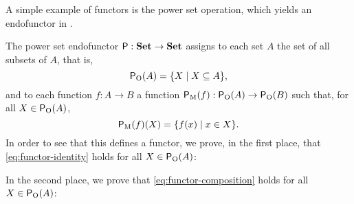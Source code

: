 A simple example of functors is the power set operation, which yields
an endofunctor in \set.

\begin{example}
  \label{ex:functor-power-set}


  The power set endofunctor $\mathsf{P}: \mathbf{Set} \to \mathbf{Set}$ assigns to each
  set $A$ the set of all subsets of $A$, that is,
  \begin{equation}
    \label{eq:functor-power-set-object}
    \mathsf{P}_{\operatorname{O}}(A) = \{X \mid X \subseteq A\}
    \text{,}
  \end{equation}
  and to each function $f: A \to B$ a function $\mathsf{P}_{\operatorname{M}}(f):
  \mathsf{P}_{\operatorname{O}}(A) \to \mathsf{P}_{\operatorname{O}}(B)$ such that, for all $X \in
  \mathsf{P}_{\operatorname{O}}(A)$,
  \begin{equation}
    \label{eq:functor-power-set-morphism}
    \mathsf{P}_{\operatorname{M}}(f)(X) = \{f(x) \mid x \in X\}
    \text{.}
  \end{equation}
  In order to see that this defines a functor, we prove, in the first
  place, that \eqref{eq:functor-identity} holds for all $X \in
  \mathsf{P}_{\operatorname{O}}(A)$:
  \begin{steps}
      \eqby{\eqref{eq:set-identity}}
      \eqbynothing
  \end{steps}
  In the second place, we prove that \eqref{eq:functor-composition}
  holds for all $X \in \mathsf{P}_{\operatorname{O}}(A)$:
  \begin{steps}
      \eqby{\eqref{eq:set-composition}}
      \eqby{\eqref{eq:functor-power-set-morphism}}
  \end{steps}

\end{example}

